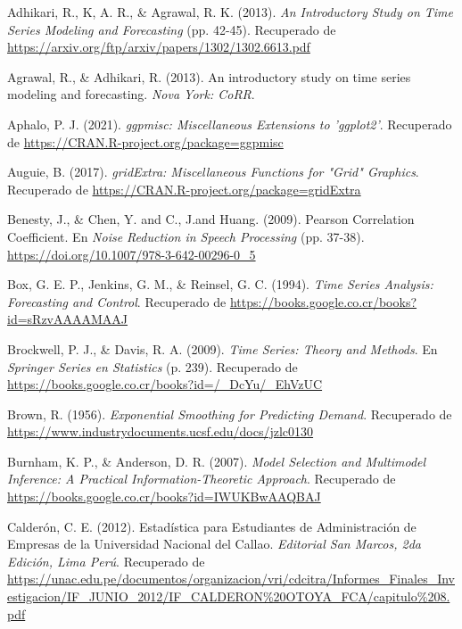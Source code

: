 \documentclass[
]{article}
\newlength{\cslhangindent}
\newlength{\cslentryspacingunit} %
\newenvironment{CSLReferences}[2] %
 {%
  \setlength{\parindent}{0pt}
  \ifodd #1
  \let\oldpar\par
  \def\par{\hangindent=\cslhangindent\oldpar}
  \fi
  \setlength{\parskip}{#2\cslentryspacingunit}
 }%
 {}
\begin{document}
\hypertarget{refs}{}
\begin{CSLReferences}{1}{0}
\leavevmode{}%
Adhikari, R., K, A. R., \& Agrawal, R. K. (2013). \emph{An Introductory
Study on Time Series Modeling and Forecasting} (pp. 42-45). Recuperado
de \url{https://arxiv.org/ftp/arxiv/papers/1302/1302.6613.pdf}

\leavevmode{}%
Agrawal, R., \& Adhikari, R. (2013). An introductory study on time
series modeling and forecasting. \emph{Nova York: CoRR}.

\leavevmode{}%
Aphalo, P. J. (2021). \emph{ggpmisc: Miscellaneous Extensions to
'ggplot2'}. Recuperado de
\url{https://CRAN.R-project.org/package=ggpmisc}

\leavevmode{}%
Auguie, B. (2017). \emph{gridExtra: Miscellaneous Functions for "Grid"
Graphics}. Recuperado de
\url{https://CRAN.R-project.org/package=gridExtra}

\leavevmode{}%
Benesty, J., \& Chen, Y. and C., J.and Huang. (2009). Pearson
Correlation Coefficient. En \emph{Noise Reduction in Speech Processing}
(pp. 37-38). \url{https://doi.org/10.1007/978-3-642-00296-0_5}

\leavevmode{}%
Box, G. E. P., Jenkins, G. M., \& Reinsel, G. C. (1994). \emph{Time
Series Analysis: Forecasting and Control}. Recuperado de
\url{https://books.google.co.cr/books?id=sRzvAAAAMAAJ}

\leavevmode{}%
Brockwell, P. J., \& Davis, R. A. (2009). \emph{Time Series: Theory and
Methods}. En \emph{Springer Series en Statistics} (p. 239). Recuperado
de \url{https://books.google.co.cr/books?id=/_DcYu/_EhVzUC}

\leavevmode{}%
Brown, R. (1956). \emph{Exponential Smoothing for Predicting Demand}.
Recuperado de \url{https://www.industrydocuments.ucsf.edu/docs/jzlc0130}

\leavevmode{}%
Burnham, K. P., \& Anderson, D. R. (2007). \emph{Model Selection and
Multimodel Inference: A Practical Information-Theoretic Approach}.
Recuperado de \url{https://books.google.co.cr/books?id=IWUKBwAAQBAJ}

\leavevmode{}%
Calderón, C. E. (2012). Estadística para Estudiantes de Administración
de Empresas de la Universidad Nacional del Callao. \emph{Editorial San
Marcos, 2da Edición, Lima Perú}. Recuperado de
\url{https://unac.edu.pe/documentos/organizacion/vri/cdcitra/Informes_Finales_Investigacion/IF_JUNIO_2012/IF_CALDERON\%20OTOYA_FCA/capitulo\%208.pdf}


\end{CSLReferences}
\end{document}
